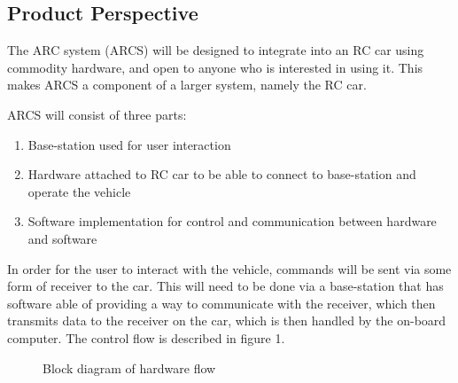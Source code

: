 \documentclass[compsoc,draftclsnofoot,onecolumn,10pt]{IEEEtran}
\begin{document}
\subsection{Product Perspective} %
The ARC system (ARCS) will be designed to integrate into an RC car using 
commodity hardware, and open to anyone who is interested in using it. This 
makes ARCS a component of a larger system, namely the RC car. \par
ARCS will consist of three parts: 
\begin{enumerate}
	\item Base-station used for user interaction
	\item Hardware attached to RC car to be able to connect to base-station and 
		operate the vehicle
	\item Software implementation for control and communication between hardware and software
\end{enumerate}
In order for the user to interact with the vehicle, commands will be sent via some form
of receiver to the car. This will need to be done via a base-station that has software able of
providing a way to communicate with the receiver, which then transmits data to the receiver on 
the car, which is then handled by the on-board computer. 
The control flow is described in figure 1. \\

\begin{figure}
  \centering
  \vspace{10cm}
  \caption{Block diagram of hardware flow}
\end{figure}


%
\end{document}
